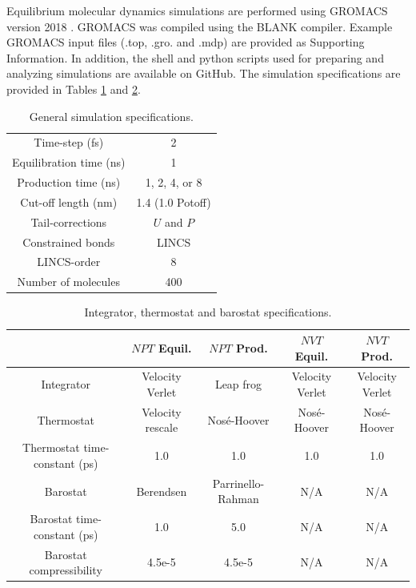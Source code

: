 \documentclass[preprint,review,12pt]{elsarticle}
\begin{document}
	Equilibrium molecular dynamics simulations are performed using GROMACS version 2018 \cite{GROMACS_2018}. GROMACS was compiled using the BLANK compiler. Example GROMACS input files (.top, .gro. and .mdp) are provided as Supporting Information. In addition, the shell and python scripts used for preparing and analyzing simulations are available on GitHub. The simulation specifications are provided in Tables \ref{tab:sim_specs} and \ref{tab:thermostats_barostats}.  
	
	\begin{table}[htb!]
		\caption{General simulation specifications.} \label{tab:sim_specs}
		\begin{center}
			\begin{tabular}{|c|c|}
				\hline
				Time-step (fs) & 2 \\
				Equilibration time (ns) & 1 \\
				Production time (ns) & 1, 2, 4, or 8 \\
				Cut-off length (nm) & 1.4 (1.0 Potoff) \\
				Tail-corrections \cite{GROMACS_note} & $U$ and $P$ \\
				Constrained bonds & LINCS \\
				LINCS-order & 8 \\			     
				Number of molecules & 400 \\
				\hline        
			\end{tabular}
		\end{center}
	\end{table}
	
	\begin{table}[h!]
		\caption{Integrator, thermostat and barostat specifications.} \label{tab:thermostats_barostats}
		\begin{center}
			\begin{tabular}{|c|c|c|c|c|}
				\hline
				& $NPT$ Equil. & $NPT$ Prod. & $NVT$ Equil. & $NVT$ Prod. \\ \hline
				Integrator & Velocity Verlet & Leap frog & Velocity Verlet & Velocity Verlet \\ \hline 
				Thermostat & Velocity rescale & Nos{\'e}-Hoover & Nos{\'e}-Hoover & Nos{\'e}-Hoover \\ \hline 
				Thermostat time-constant (ps) & 1.0 & 1.0 & 1.0 & 1.0 \\ \hline
				Barostat & Berendsen & Parrinello-Rahman & N/A & N/A \\ \hline
				Barostat time-constant (ps) & 1.0 & 5.0 & N/A & N/A \\ \hline
				Barostat compressibility & 4.5e-5 & 4.5e-5 & N/A & N/A \\
				\hline
			\end{tabular}
		\end{center} 
	\end{table}
	
\end{document}
